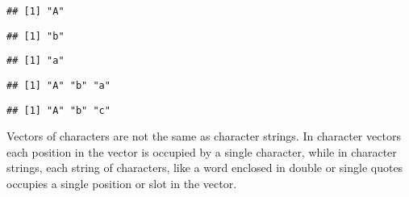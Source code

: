 \documentclass[paper=a4,10pt,div=17,headsepline,BCOR=12mm,twoside,open=right]{scrbook}\usepackage{knitr}
\begin{document}
\begin{knitrout}\footnotesize
{}\color{fgcolor}\begin{kframe}
\begin{alltt}
 \hlkwb{<-} 
 \hlkwb{<-} \hlstd{letters[}\hlstd{]}
 \hlkwb{<-} \hlstd{letters[}\hlstd{]}
\end{alltt}
\begin{verbatim}
## [1] "A"
\end{verbatim}
\begin{alltt}
\end{alltt}
\begin{verbatim}
## [1] "b"
\end{verbatim}
\begin{alltt}
\end{alltt}
\begin{verbatim}
## [1] "a"
\end{verbatim}
\begin{alltt}
 \hlkwb{<-} 
\end{alltt}
\begin{verbatim}
## [1] "A" "b" "a"
\end{verbatim}
\begin{alltt}
 \hlkwb{<-}  \hlstd{)}
\end{alltt}
\begin{verbatim}
## [1] "A" "b" "c"
\end{verbatim}
\begin{alltt}
 \hlkwb{<-} 
 \hlopt{+} \hlstd{)}
\end{alltt}
\end{kframe}
\end{knitrout}

Vectors of characters are not the same as character strings. In character vectors each position in the vector is occupied by a single character, while in character strings, each string of characters, like a word enclosed in double or single quotes occupies a single position or slot in the vector.
\end{document}
